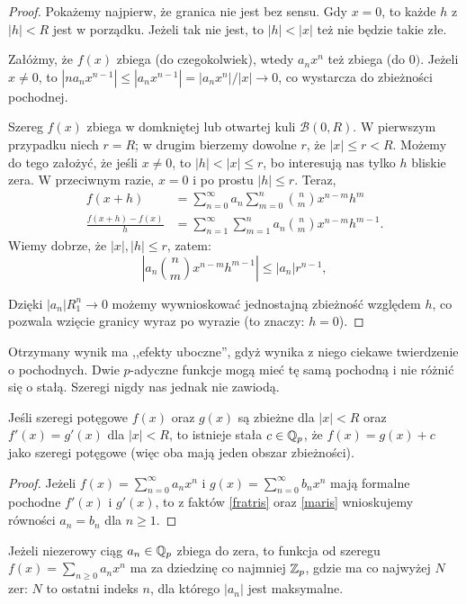 \begin{proof}
	Pokażemy najpierw, że granica nie jest bez sensu.
	Gdy $x = 0$, to każde $h$ z $|h| < R $ jest w porządku. 
	Jeżeli tak nie jest, to $|h| < |x|$ też nie będzie takie złe.

	Załóżmy, że $f(x)$ zbiega (do czegokolwiek), wtedy $a_n x^n$ też zbiega (do $0)$.
	Jeżeli $x \neq 0$, to $|na_nx^{n-1}| \le |a_nx^{n-1}| = |a_nx^n|/|x| \to 0$, co wystarcza do zbieżności pochodnej.

	Szereg $f(x)$ zbiega w domkniętej lub otwartej kuli $\mathcal B(0, R )$.
	W pierwszym przypadku niech $r = R $; w drugim bierzemy dowolne $r$, że $|x| \le r < R $.
	Możemy do tego założyć, że jeśli $x \neq 0$, to $|h| < |x| \le r$, bo interesują nas tylko $h$ bliskie zera.
	W przeciwnym razie, $x = 0$ i po prostu $|h| \le r$.
	Teraz,
	\begin{align*}
		f(x+h)                  & = \sum_{n = 0}^\infty a_n \sum_{m = 0}^n {n \choose m} x^{n-m} h^m \\
		\frac{f(x+h) - f(x)}{h} & = \sum_{n = 1}^\infty \sum_{m = 1}^n a_n {n \choose m} x^{n-m} h^{m-1}.
		\end{align*}
	Wiemy dobrze, że $|x|, |h| \le r$, zatem:
	\[
		\left| a_n {n \choose m} x^{n-m} h^{m-1} \right| \le |a_n| r^{n-1},
	\]

	Dzięki $|a_n|R _1^n \to 0$ możemy wywnioskować jednostajną zbieżność względem $h$, co pozwala wzięcie granicy wyraz po wyrazie (to znaczy: $h = 0$).
\end{proof}

Otrzymany wynik ma ,,efekty uboczne'', gdyż wynika z niego ciekawe twierdzenie o pochodnych.
Dwie $p$-adyczne funkcje mogą mieć tę samą pochodną i nie różnić się o stałą.
Szeregi nigdy nas jednak nie zawiodą.

\begin{fakt}
	Jeśli szeregi potęgowe $f(x)$ oraz $g(x)$ są zbieżne dla $|x| < R $ oraz $f'(x) = g'(x)$ dla $|x| < R $, to istnieje stała $c \in \mathbb Q_p$, że $f(x) = g(x) + c$ jako szeregi potęgowe (więc oba mają jeden obszar zbieżności). 
\end{fakt}

\begin{proof}
	Jeżeli $f(x) = \sum_{n = 0}^\infty a_n x^n$ i $g(x) = \sum_{n = 0}^\infty b_n x^n$ mają formalne pochodne $f'(x)$ i $g'(x)$, to z faktów \ref{fratris} oraz \ref{maris} wnioskujemy równości $a_n = b_n$ dla $n \ge 1$.
\end{proof}

\begin{twierdzenie}[Strassman, 1928]
	Jeżeli niezerowy ciąg $a_n \in \mathbb Q_p$ zbiega do zera, to funkcja od szeregu $f(x) = \sum_{n \ge 0} a_n x^n$ ma za dziedzinę co najmniej $\mathbb Z_p$, gdzie ma co najwyżej $N$ zer: $N$ to ostatni indeks $n$, dla którego $|a_n|$ jest maksymalne.
\end{twierdzenie}

